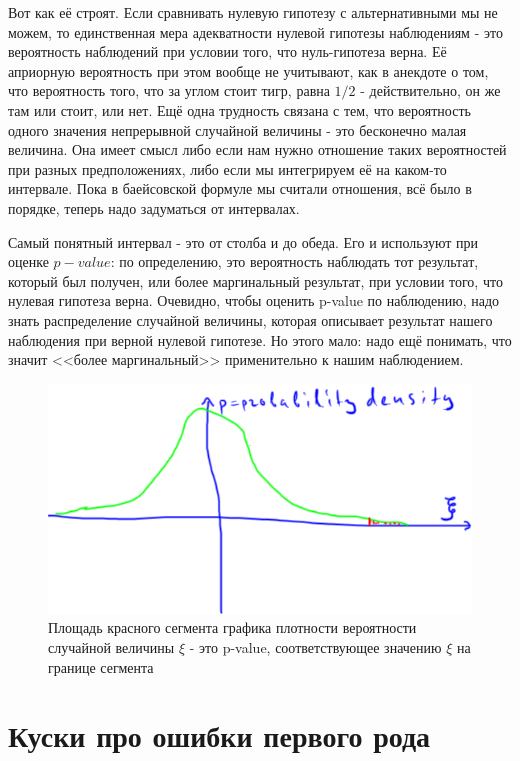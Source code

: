 \documentclass{book}
\begin{document}
Вот как её строят. Если сравнивать нулевую гипотезу с альтернативными мы не можем, то единственная мера адекватности нулевой гипотезы наблюдениям - это вероятность наблюдений при условии того, что нуль-гипотеза верна. Её априорную вероятность при этом вообще не учитывают, как в анекдоте о том, что вероятность того, что за углом стоит тигр, равна $1/2$ - действительно, он же там или стоит, или нет. Ещё одна трудность связана с тем, что вероятность одного значения непрерывной случайной величины - это бесконечно малая величина. Она имеет смысл либо если нам нужно отношение таких вероятностей при разных предположениях, либо если мы интегрируем её на каком-то интервале. Пока в баейсовской формуле мы считали отношения, всё было в порядке, теперь надо задуматься от интервалах.

Самый понятный интервал - это от столба и до обеда. Его и используют при оценке $p-value$: по определению, это вероятность наблюдать тот результат, который был получен, или более маргинальный результат, при условии того, что нулевая гипотеза верна. Очевидно, чтобы оценить p-value по наблюдению, надо знать распределение случайной величины, которая описывает результат нашего наблюдения при верной нулевой гипотезе. Но этого мало: надо ещё понимать, что значит <<более маргинальный>> применительно к нашим наблюдением. 


\begin{figure}
    \centering
    \includegraphics[scale=.5]{img/p-value.png}
    \caption{Площадь красного сегмента графика плотности вероятности случайной величины $\xi$ - это p-value, соответствующее значению $\xi$ на границе сегмента}
    \label{pval}
\end{figure}




\section*{Куски про ошибки первого рода}
\end{document}
